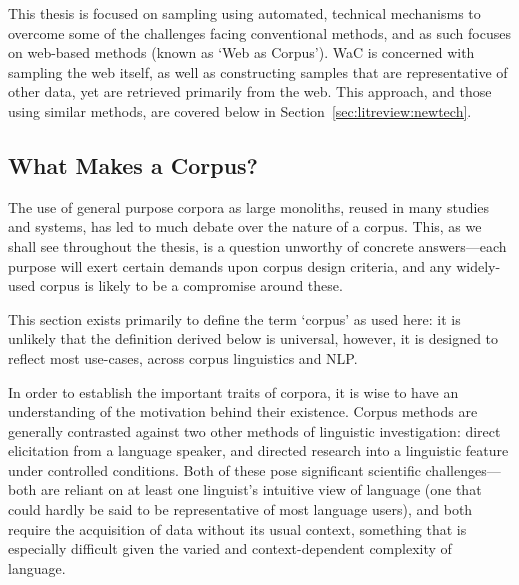 
This thesis is focused on sampling using automated, technical mechanisms to overcome some of the challenges facing conventional methods, and as such focuses on web-based methods (known as `Web as Corpus').  WaC is concerned with sampling the web itself, as well as constructing samples that are representative of other data, yet are retrieved primarily from the web.  This approach, and those using similar methods, are covered below in Section~\ref{sec:litreview:newtech}.






















\subsection{What Makes a Corpus?}
The use of general purpose corpora as large monoliths, reused in many studies and systems, has led to much debate over the nature of a corpus.  This, as we shall see throughout the thesis, is a question unworthy of concrete answers---each purpose will exert certain demands upon corpus design criteria, and any widely-used corpus is likely to be a compromise around these.

This section exists primarily to define the term `corpus' as used here: it is unlikely that the definition derived below is universal, however, it is designed to reflect most use-cases, across corpus linguistics and NLP.




In order to establish the important traits of corpora, it is wise to have an understanding of the motivation behind their existence.  Corpus methods are generally contrasted against two other methods of linguistic investigation: direct elicitation from a language speaker, and directed research into a linguistic feature under controlled conditions.  Both of these pose significant scientific challenges---both are reliant on at least one linguist's intuitive view of language (one that could hardly be said to be representative of most language users), and both require the acquisition of data without its usual context, something that is especially difficult given the varied and context-dependent complexity of language.

